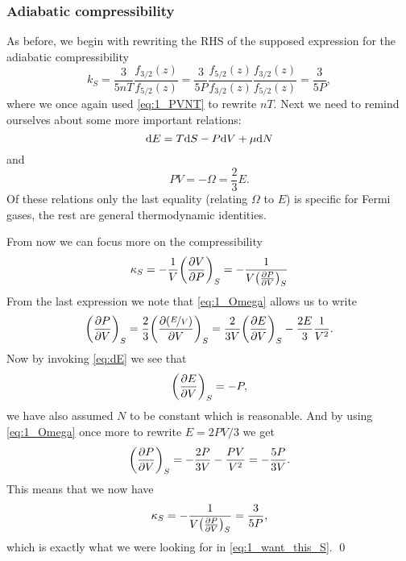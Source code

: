 \documentclass[11pt,letter, swedish, english
]{article}
\begin{document}
\subsubsection{Adiabatic compressibility}
As before, we begin with rewriting the RHS of the supposed expression
for the adiabatic compressibility
\begin{equation}\label{eq:1_want_this_S}
k_S=\frac{3}{5nT}\frac{f_{3/2}(z)}{f_{5/2}(z)}
=\frac{3}{5P}\frac{f_{5/2}(z)}{f_{3/2}(z)}\frac{f_{3/2}(z)}{f_{5/2}(z)}
=\frac{3}{5P},
\end{equation}
where we once again used \eqref{eq:1_PVNT} to rewrite $nT$. Next we
need to remind ourselves about some more important relations:
\begin{equation}\label{eq:dE}
\mathrm{d}{E}=T\mathrm{d}{S}-P\mathrm{d}{V}+\mu\mathrm{d}{N}
\end{equation}
and
\begin{equation}\label{eq:1_Omega}
PV=-\Omega=\frac{2}{3}E.
\end{equation}
Of these relations only the last equality (relating $\Omega$ to $E$)
is specific for Fermi gases, the rest are general thermodynamic
identities. 

From now we can focus more on the compressibility
\begin{equation}
\kappa_S=-\frac{1}{V}\qty(\pdv{V}{P})_S
=-\frac{1}{V\qty(\pdv{P}{V})_S}
\end{equation}
From the last expression we note that \eqref{eq:1_Omega} allows us to
write
\begin{equation}
\qty(\pdv{P}{V})_S=\frac{2}{3}\qty(\pdv{(\nicefrac{E}{V})}{V})_S
=\frac{2}{3V}\qty(\pdv{E}{V})_S-\frac{2E}{3}\frac{1}{V^2}.
\end{equation}
Now by invoking \eqref{eq:dE} we see that
\begin{equation}
\qty(\pdv{E}{V})_S=-P,
\end{equation}
we have also assumed $N$ to be constant which is reasonable. And by
using \eqref{eq:1_Omega} once more to rewrite $E=2PV/3$ we get
\begin{equation}
\qty(\pdv{P}{V})_S=-\frac{2P}{3V}-\frac{PV}{V^2}=-\frac{5P}{3V}.
\end{equation}
This means that we now have
\begin{equation}
\kappa_S=-\frac{1}{V\qty(\pdv{P}{V})_S}=\frac{3}{5P},
\end{equation}
which is exactly what we were looking for in
\eqref{eq:1_want_this_S}.\footnotemark{}
\qed

\end{document}
